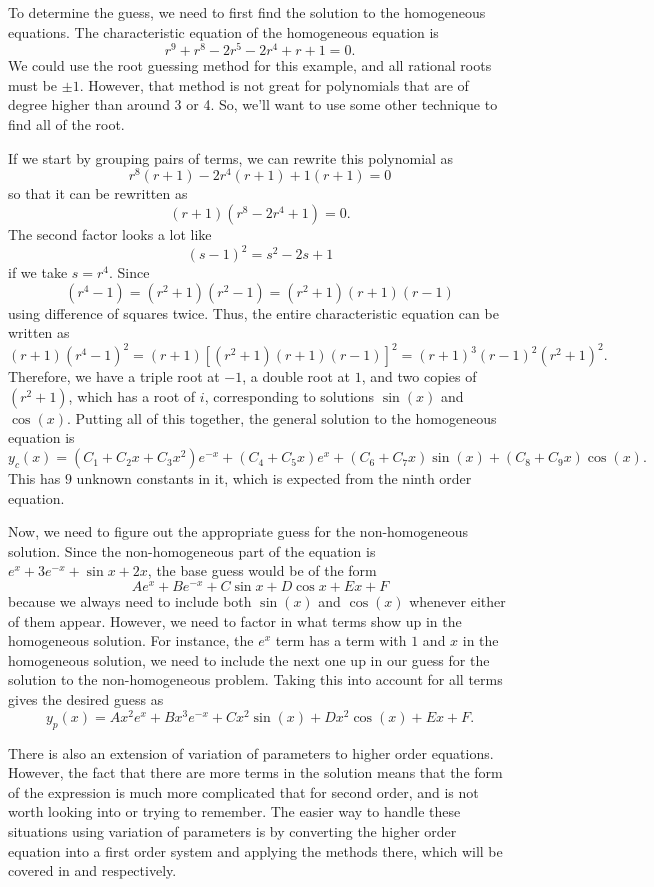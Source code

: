 \documentclass{ximera}
\begin{document}
\begin{exampleSol}
To determine the guess, we need to first find the solution to the homogeneous equations. The characteristic equation of the homogeneous equation is
\[ 
    r^9 + r^8 - 2r^5 - 2r^4 + r + 1 = 0. 
\] 
We could use the root guessing method for this example, and all rational roots must be $\pm 1$. However, that method is not great for polynomials that are of degree higher than around 3 or 4. So, we'll want to use some other technique to find all of the root.

If we start by grouping pairs of terms, we can rewrite this polynomial as
\[ 
    r^8(r+1) - 2r^4(r+1) + 1 (r+1) = 0 
\] 
so that it can be rewritten as 
\[ 
    (r+1)(r^8 - 2r^4 + 1) = 0.
\] 
The second factor looks a lot like
\[ 
    (s-1)^2 = s^2 - 2s +1 
\] 
if we take $s = r^4$. Since 
\[ 
    (r^4 - 1) = (r^2 + 1)(r^2 - 1) = (r^2 + 1)(r+1)(r-1) 
\] 
using difference of squares twice. Thus, the entire characteristic equation can be written as
\[ 
    (r+1)(r^4-1)^2 = (r+1)[(r^2 + 1)(r+1)(r-1)]^2 = (r+1)^3(r-1)^2(r^2 + 1)^2. 
\]
Therefore, we have a triple root at $-1$, a double root at $1$, and two copies of $(r^2 + 1)$, which has a root of $i$, corresponding to solutions $\sin(x)$ and $\cos(x)$. Putting all of this together, the general solution to the homogeneous equation is
\[
     y_c(x) = (C_1 + C_2x + C_3x^2)e^{-x} + (C_4 + C_5x)e^{x} + (C_6 + C_7x)\sin(x) + (C_8 + C_9x)\cos(x) .
\] 
This has $9$ unknown constants in it, which is expected from the ninth order equation. 

Now, we need to figure out the appropriate guess for the non-homogeneous solution. Since the non-homogeneous part of the equation is $e^{x} + 3e^{-x} + \sin{x} +2x$, the base guess would be of the form
\[ 
    Ae^x + Be^{-x} + C\sin{x} + D\cos{x} + Ex + F 
\] 
because we always need to include both $\sin(x)$ and $\cos(x)$ whenever either of them appear. However, we need to factor in what terms show up in the homogeneous solution. For instance, the $e^x$ term has a term with $1$ and $x$ in the homogeneous solution, we need to include the next one up in our guess for the solution to the non-homogeneous problem. Taking this into account for all terms gives the desired guess as 
\[ 
    y_p(x) = Ax^2e^{x} + Bx^3e^{-x} + Cx^2\sin(x) + Dx^2\cos(x) + Ex + F.
\]
\end{exampleSol}

There is also an extension of variation of parameters to higher order equations. However, the fact that there are more terms in the solution means that the form of the expression is much more complicated that for second order, and is not worth looking into or trying to remember. The easier way to handle these situations using variation of parameters is by converting the higher order equation into a first order system and applying the methods there, which will be covered in  and  respectively. 
\end{document}
